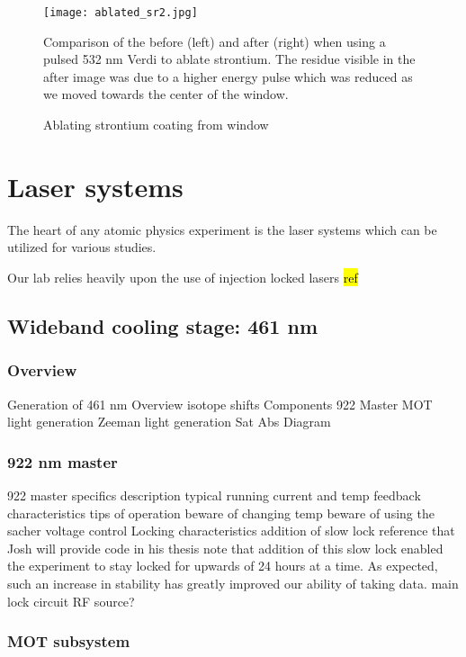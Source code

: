 	\begin{figure}
		\centerline{
		\texttt{[image: ablated\_sr2.jpg]}}
		\caption{Ablating strontium coating from window}{Comparison of the before (left) and after (right) when using a pulsed 532 nm Verdi to ablate strontium. The residue visible in the after image was due to a higher energy pulse which was reduced as we moved towards the center of the window.}
		\label{fig:ablating_strontium}
	\end{figure} 



\section{Laser systems}\label{sec:laser_systems}

The heart of any atomic physics experiment is the laser systems which can be utilized for various studies. 

Our lab relies heavily upon the use of injection locked lasers \hl{ref}

\subsection{Wideband cooling stage: 461 nm}
\label{ssec:461sys}

\subsubsection{Overview}

Generation of 461 nm
	Overview
		isotope shifts
	Components
		922 Master
		MOT light generation
		Zeeman light generation
		Sat Abs
	Diagram

\subsubsection{922 nm master}

922 master specifics
	description
	typical running current and temp
	feedback characteristics
	tips of operation
		beware of changing temp
		beware of using the sacher voltage control
	Locking characteristics
		addition of slow lock
			reference that Josh will provide code in his thesis
			note that addition of this slow lock enabled the experiment to stay locked for upwards of 24 hours at a time. As expected, such an increase in stability has greatly improved our ability of taking data.
		main lock circuit
		RF source?

\subsubsection{MOT subsystem}

